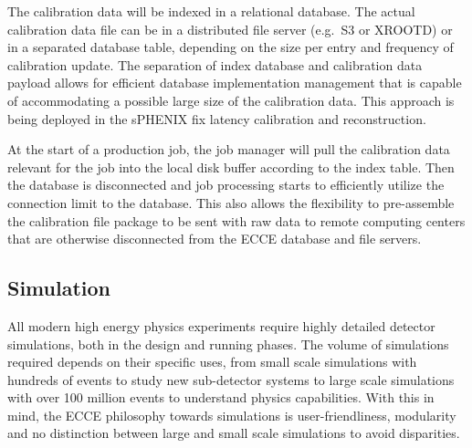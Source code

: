 The calibration data will be indexed in a relational database. The actual calibration data file can be in a distributed file server (e.g.\ S3 or XROOTD) or in a separated database table, depending on the size per entry and frequency of calibration update. The separation of index database and calibration data payload allows for efficient database implementation management that is capable of accommodating a possible large size of the calibration data. This approach is being deployed in the sPHENIX fix latency calibration and reconstruction.

At the start of a production job, the job manager will pull the calibration data relevant for the job into the local disk buffer according to the index table. Then the database is disconnected and job processing starts to efficiently utilize the connection limit to the database. This also allows the flexibility to pre-assemble the calibration file package to be sent with raw data to remote computing centers that are otherwise disconnected from the ECCE database and file servers. 





\subsection{Simulation}






	All modern high energy physics experiments require highly detailed detector simulations, both in the design and running phases. The volume of simulations required depends on their specific uses, from small scale simulations with hundreds of events to study new sub-detector systems to large scale simulations with over 100 million events to understand physics capabilities. With this in mind, the ECCE philosophy towards simulations is user-friendliness, modularity and no distinction between large and small scale simulations to avoid disparities. 
	
